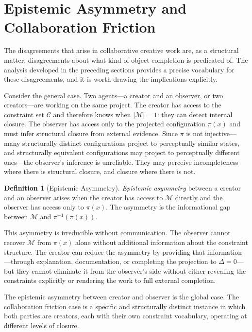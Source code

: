 \documentclass[11pt, twoside]{article}
\theoremstyle{plain}
\theoremstyle{definition}
\newtheorem{definition}[theorem]{Definition}
\theoremstyle{remark}
\begin{document}
\section{Epistemic Asymmetry and Collaboration Friction}
\label{sec:asymmetry}

The disagreements that arise in collaborative creative work are, as a structural matter, disagreements about what kind of object completion is predicated of. The analysis developed in the preceding sections provides a precise vocabulary for these disagreements, and it is worth drawing the implications explicitly.

Consider the general case. Two agents---a creator and an observer, or two creators---are working on the same project. The creator has access to the constraint set $\mathcal{C}$ and therefore knows when $|\mathcal{M}| = 1$: they can detect internal closure. The observer has access only to the projected configuration $\pi(x)$ and must infer structural closure from external evidence. Since $\pi$ is not injective---many structurally distinct configurations project to perceptually similar states, and structurally equivalent configurations may project to perceptually different ones---the observer's inference is unreliable. They may perceive incompleteness where there is structural closure, and closure where there is not.

\begin{definition}[Epistemic Asymmetry]
\emph{Epistemic asymmetry} between a creator and an observer arises when the creator has access to $\mathcal{M}$ directly and the observer has access only to $\pi(x)$. The asymmetry is the informational gap between $\mathcal{M}$ and $\pi^{-1}(\pi(x))$.
\end{definition}

This asymmetry is irreducible without communication. The observer cannot recover $\mathcal{M}$ from $\pi(x)$ alone without additional information about the constraint structure. The creator can reduce the asymmetry by providing that information---through explanation, documentation, or completing the projection to $\Delta = 0$---but they cannot eliminate it from the observer's side without either revealing the constraints explicitly or rendering the work to full external completion.

The epistemic asymmetry between creator and observer is the global case. The collaboration friction case is a specific and structurally distinct instance in which both parties are creators, each with their own constraint vocabulary, operating at different levels of closure.
\end{document}

